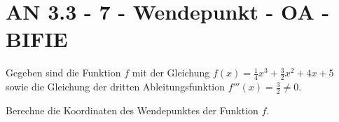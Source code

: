 \section{AN 3.3 - 7 - Wendepunkt - OA - BIFIE}

\begin{beispiel}[AN 3.3]{1} %
	Gegeben sind die Funktion $f$ mit der Gleichung \mbox{$f(x)=\frac{1}{4}x^3+\frac{3}{2}x^2+4x+5$} sowie die Gleichung der dritten Ableitungsfunktion $f'''(x)=\frac{3}{2}\neq 0$.
	
Berechne die Koordinaten des Wendepunktes der Funktion $f$.	



\end{beispiel}